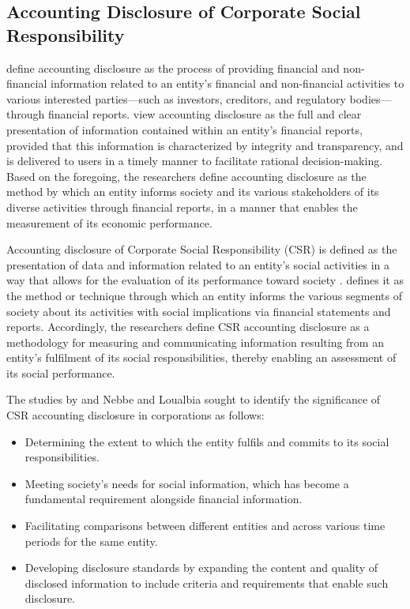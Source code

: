 \documentclass{NSP1}
\begin{document}
\subsection{Accounting Disclosure of Corporate Social Responsibility}
\cite{ref36,ref30} define accounting disclosure as the process of providing financial and non-financial information related to an entity's financial and non-financial activities to various interested parties---such as investors, creditors, and regulatory bodies---through financial reports. \cite{ref9} view accounting disclosure as the full and clear presentation of information contained within an entity's financial reports, provided that this information is characterized by integrity and transparency, and is delivered to users in a timely manner to facilitate rational decision-making. Based on the foregoing, the researchers define accounting disclosure as the method by which an entity informs society and its various stakeholders of its diverse activities through financial reports, in a manner that enables the measurement of its economic performance.

Accounting disclosure of Corporate Social Responsibility (CSR) is defined as the presentation of data and information related to an entity's social activities in a way that allows for the evaluation of its performance toward society \cite{ref21}. \cite{ref22} defines it as the method or technique through which an entity informs the various segments of society about its activities with social implications via financial statements and reports. Accordingly, the researchers define CSR accounting disclosure as a methodology for measuring and communicating information resulting from an entity's fulfilment of its social responsibilities, thereby enabling an assessment of its social performance.

The studies by \cite{ref23} and Nebbe and Loualbia \cite{ref24} sought to identify the significance of CSR accounting disclosure in corporations as follows:
\begin{itemize}
\item Determining the extent to which the entity fulfils and commits to its social responsibilities.
\item Meeting society's needs for social information, which has become a fundamental requirement alongside financial information.
\item Facilitating comparisons between different entities and across various time periods for the same entity.
\item Developing disclosure standards by expanding the content and quality of disclosed information to include criteria and requirements that enable such disclosure.
\end{itemize}
\end{document}
